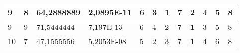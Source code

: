\documentclass[conference]{IEEEtran}
\begin{document}
\begin{table*}[]
\begin{tabular}{|llll|llllllll|}
\multicolumn{1}{|l|}{9}                                                     & \multicolumn{1}{l|}{8}                                                        & \multicolumn{1}{l|}{64,2888889}                                                   & 2,0895E-11                     & \multicolumn{1}{l|}{6}                                                  & \multicolumn{1}{l|}{3}                                                  & \multicolumn{1}{l|}{\textbf{1}}                                         & \multicolumn{1}{l|}{7}                                                  & \multicolumn{1}{l|}{2}                                                  & \multicolumn{1}{l|}{4}                                                  & \multicolumn{1}{l|}{5}                                                  & 8                          \\ \hline
\multicolumn{1}{|l|}{9}                                                     & \multicolumn{1}{l|}{9}                                                        & \multicolumn{1}{l|}{71,5444444}                                                   & 7,197E-13                      & \multicolumn{1}{l|}{6}                                                  & \multicolumn{1}{l|}{4}                                                  & \multicolumn{1}{l|}{2}                                                  & \multicolumn{1}{l|}{7}                                                  & \multicolumn{1}{l|}{\textbf{1}}                                         & \multicolumn{1}{l|}{3}                                                  & \multicolumn{1}{l|}{5}                                                  & 8                          \\ \hline
\multicolumn{1}{|l|}{10}                                                    & \multicolumn{1}{l|}{7}                                                        & \multicolumn{1}{l|}{47,1555556}                                                   & 5,2053E-08                     & \multicolumn{1}{l|}{5}                                                  & \multicolumn{1}{l|}{2}                                                  & \multicolumn{1}{l|}{3}                                                  & \multicolumn{1}{l|}{7}                                                  & \multicolumn{1}{l|}{\textbf{1}}                                         & \multicolumn{1}{l|}{4}                                                  & \multicolumn{1}{l|}{6}                                                  & 8                          \\ \hline

\end{tabular}
\end{table*}
\end{document}
